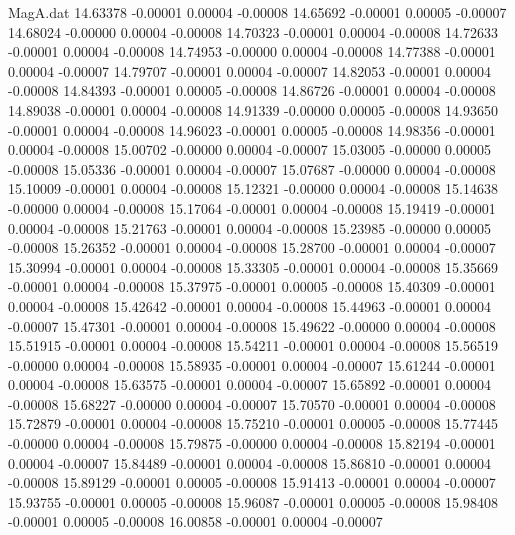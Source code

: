 \begin{filecontents}{MagA.dat}
  14.63378   -0.00001    0.00004   -0.00008
  14.65692   -0.00001    0.00005   -0.00007
  14.68024   -0.00000    0.00004   -0.00008
  14.70323   -0.00001    0.00004   -0.00008
  14.72633   -0.00001    0.00004   -0.00008
  14.74953   -0.00000    0.00004   -0.00008
  14.77388   -0.00001    0.00004   -0.00007
  14.79707   -0.00001    0.00004   -0.00007
  14.82053   -0.00001    0.00004   -0.00008
  14.84393   -0.00001    0.00005   -0.00008
  14.86726   -0.00001    0.00004   -0.00008
  14.89038   -0.00001    0.00004   -0.00008
  14.91339   -0.00000    0.00005   -0.00008
  14.93650   -0.00001    0.00004   -0.00008
  14.96023   -0.00001    0.00005   -0.00008
  14.98356   -0.00001    0.00004   -0.00008
  15.00702   -0.00000    0.00004   -0.00007
  15.03005   -0.00000    0.00005   -0.00008
  15.05336   -0.00001    0.00004   -0.00007
  15.07687   -0.00000    0.00004   -0.00008
  15.10009   -0.00001    0.00004   -0.00008
  15.12321   -0.00000    0.00004   -0.00008
  15.14638   -0.00000    0.00004   -0.00008
  15.17064   -0.00001    0.00004   -0.00008
  15.19419   -0.00001    0.00004   -0.00008
  15.21763   -0.00001    0.00004   -0.00008
  15.23985   -0.00000    0.00005   -0.00008
  15.26352   -0.00001    0.00004   -0.00008
  15.28700   -0.00001    0.00004   -0.00007
  15.30994   -0.00001    0.00004   -0.00008
  15.33305   -0.00001    0.00004   -0.00008
  15.35669   -0.00001    0.00004   -0.00008
  15.37975   -0.00001    0.00005   -0.00008
  15.40309   -0.00001    0.00004   -0.00008
  15.42642   -0.00001    0.00004   -0.00008
  15.44963   -0.00001    0.00004   -0.00007
  15.47301   -0.00001    0.00004   -0.00008
  15.49622   -0.00000    0.00004   -0.00008
  15.51915   -0.00001    0.00004   -0.00008
  15.54211   -0.00001    0.00004   -0.00008
  15.56519   -0.00000    0.00004   -0.00008
  15.58935   -0.00001    0.00004   -0.00007
  15.61244   -0.00001    0.00004   -0.00008
  15.63575   -0.00001    0.00004   -0.00007
  15.65892   -0.00001    0.00004   -0.00008
  15.68227   -0.00000    0.00004   -0.00007
  15.70570   -0.00001    0.00004   -0.00008
  15.72879   -0.00001    0.00004   -0.00008
  15.75210   -0.00001    0.00005   -0.00008
  15.77445   -0.00000    0.00004   -0.00008
  15.79875   -0.00000    0.00004   -0.00008
  15.82194   -0.00001    0.00004   -0.00007
  15.84489   -0.00001    0.00004   -0.00008
  15.86810   -0.00001    0.00004   -0.00008
  15.89129   -0.00001    0.00005   -0.00008
  15.91413   -0.00001    0.00004   -0.00007
  15.93755   -0.00001    0.00005   -0.00008
  15.96087   -0.00001    0.00005   -0.00008
  15.98408   -0.00001    0.00005   -0.00008
  16.00858   -0.00001    0.00004   -0.00007

\end{filecontents}
